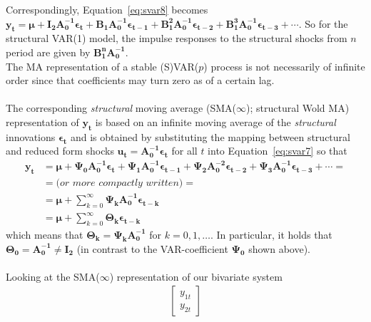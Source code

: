 \documentclass[a4paper,11pt,listof=nochaptergap,oneside,pointednumbers,bibtotoc,bigheadings,liststotoc]{scrbook}
\theoremstyle{mysatz}
\theoremstyle{mydefinition}
\theoremstyle{mybemerkung}
\newcommand{\vect}[1]{\boldsymbol{\mathbf{#1}}}
\begin{document}
\begin{itemize}
{Correspondingly, Equation~\ref{eq:svar8} becomes $\vect{y_t} = \vect{\mu} + \vect{I_2}\vect{{A}_0^{-1}}\vect{\epsilon_t} + \vect{{B}_1}\vect{{A}_0^{-1}}\vect{\epsilon_{t-1}} + \vect{{B}_1^2}\vect{{A}_0^{-1}}\vect{\epsilon_{t-2}} + \vect{{B}_1^3}\vect{{A}_0^{-1}}\vect{\epsilon_{t-3}} + \cdots$. So for the structural VAR(1) model, the impulse responses to the structural shocks from $n$ period are given by $\vect{{B}_1^n}\vect{{A}_0^{-1}}$.\\
The MA representation of a stable (S)VAR($p$) process is not necessarily of infinite order since that coefficients may turn zero as of a certain lag.} \\
\\
The corresponding \textit{structural} moving average (SMA($\infty$); structural Wold MA) representation of $\vect{y_t}$ is based on an infinite moving average of the \textit{structural} innovations $\vect{\epsilon_t}$ and is obtained by substituting the mapping between structural and reduced form shocks $\vect{u_t} = \vect{A_0^{-1}}\vect{\epsilon_t}$ for all $t$ into Equation~\ref{eq:svar7} so that
\begin{equation} \label{eq:svar8}
\begin{split}
 			\vect{y_t} & = \vect{\mu} + \vect{\Psi_0}\vect{A_0^{-1}}\vect{\epsilon_t} + \vect{\Psi_1}\vect{A_0^{-1}}\vect{\epsilon_{t-1}} + \vect{\Psi_{2}}\vect{A_0^{-2}}\vect{\epsilon_{t-2}} + \vect{\Psi_{3}}\vect{A_0^{-1}}\vect{\epsilon_{t-3}} + \cdots = \\
			& = \textit{(or more compactly written)} = \\
			& = \vect{\mu} + \sum\limits_{k=0}^\infty \vect{\Psi_k}\vect{A_0^{-1}}\vect{\epsilon_{t-k}} \\
			& = \vect{\mu} + \sum\limits_{k=0}^\infty \vect{\Theta_k}\vect{\epsilon_{t-k}}
\end{split}								
\end{equation}
which means that $\vect{\Theta_k} = \vect{\Psi_k}\vect{A_0^{-1}}$ for $k = 0, 1, \dots$. In particular, it holds that $\vect{\Theta_0}=\vect{A_0^{-1}} \neq \vect{I_2}$ (in contrast to the VAR-coefficient $\vect{\Psi_0}$ shown above). \\
\\
Looking at the SMA($\infty$) representation of our bivariate system 
\begin{equation} \label{eq:svar9}
\begin{split}
	\begin{bmatrix}
    	y_{1t} \\
    	y_{2t}

\end{bmatrix}
\end{split}
\end{equation}
\end{itemize}
\end{document}
